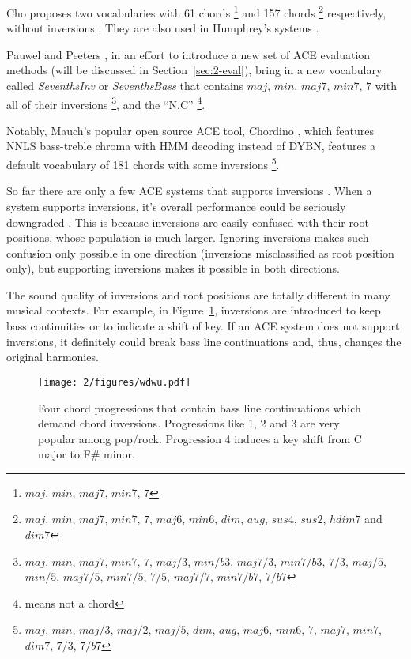 Cho \cite{cho2014improved} proposes two vocabularies with 61 chords \footnote{$maj$, $min$, $maj7$, $min7$, $7$} and 157 chords \footnote{$maj$, $min$, $maj7$, $min7$, $7$, $maj6$, $min6$, $dim$, $aug$, $sus4$, $sus2$, $hdim7$ and $dim7$} respectively, without inversions \cite{burgoyne2014comparative}. They are also used in Humphrey's systems \cite{humphreyfour,humphrey2015exploration}.

Pauwel and Peeters \cite{pauwels2013evaluating}, in an effort to introduce a new set of ACE evaluation methods (will be discussed in Section~\ref{sec:2-eval}), bring in a new vocabulary called \textit{SeventhsInv} or \textit{SeventhsBass} that contains $maj$, $min$, $maj7$, $min7$, $7$ with all of their inversions \footnote{$maj$, $min$, $maj7$, $min7$, $7$, $maj/3$, $min/b3$, $maj7/3$, $min7/b3$, $7/3$, $maj/5$, $min/5$, $maj7/5$, $min7/5$, $7/5$, $maj7/7$, $min7/b7$, $7/b7$}, and the ``N.C'' \footnote{means not a chord}.

Notably, Mauch's popular open source ACE tool, Chordino \cite{cannam2010sonic}, which features NNLS bass-treble chroma with HMM decoding instead of DYBN, features a default vocabulary of 181 chords with some inversions \footnote{$maj$, $min$, $maj/3$, $maj/2$, $maj/5$, $dim$, $aug$, $maj6$, $min6$, $7$, $maj7$, $min7$, $dim7$, $7/3$, $7/b7$}.


So far there are only a few ACE systems that supports inversions \cite{cannam2010sonic,mauch2010automatic,ni2012end,mcvicar2013machine,deng2016chord,deng2016hybrid}. When a system supports inversions, it's overall performance could be seriously downgraded \cite{deng2016chord}. This is because inversions are easily confused with their root positions, whose population is much larger. Ignoring inversions makes such confusion only possible in one direction (inversions misclassified as root position only), but supporting inversions makes it possible in both directions.

The sound quality of inversions and root positions are totally different in many musical contexts. For example, in Figure~\ref{fig:2-wdwu}, inversions are introduced to keep bass continuities or to indicate a shift of key. If an ACE system does not support inversions, it definitely could break bass line continuations and, thus, changes the original harmonies.
\begin{figure}[htb]
\centering
\texttt{[image: 2/figures/wdwu.pdf]}
\caption{Four chord progressions that contain bass line continuations which demand chord inversions. Progressions like 1, 2 and 3 are very popular among pop/rock. Progression 4 induces a key shift from C major to F\# minor.}
\label{fig:2-wdwu}
\end{figure}

